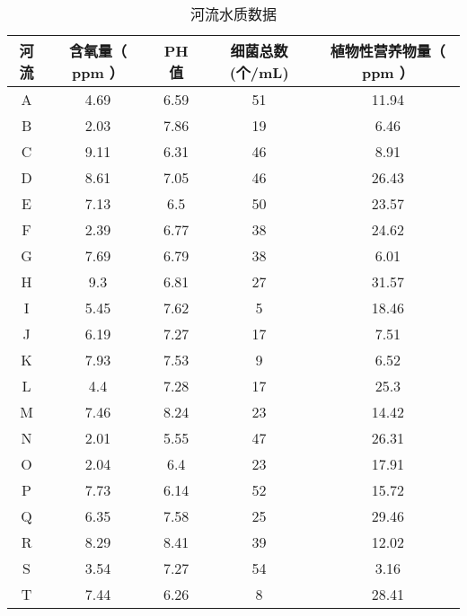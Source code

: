 \documentclass[withoutpreface]{cumcmthesis}
\begin{document}
    \begin{table}[H]
        \centering
        \caption{河流水质数据}\label{Tab:1}
        \begin{tabular}{|c|c|c|c|c|}
        \hline
        \textbf{河流} & \multicolumn{1}{c|}{\textbf{含氧量（ ppm ）}} & \multicolumn{1}{c|}{\textbf{PH 值}} & \multicolumn{1}{c|}{\textbf{细菌总数(个/mL)}} & \multicolumn{1}{c|}{\textcolor[rgb]{ .2,  .2,  .2}{\textbf{植物性营养物量（ ppm ）}}} \bigstrut\\
        \hline
        A     & 4.69  & 6.59  & 51    & 11.94 \bigstrut\\
        \hline
        B     & 2.03  & 7.86  & 19    & 6.46 \bigstrut\\
        \hline
        C     & 9.11  & 6.31  & 46    & 8.91 \bigstrut\\
        \hline
        D     & 8.61  & 7.05  & 46    & 26.43 \bigstrut\\
        \hline
        E     & 7.13  & 6.5   & 50    & 23.57 \bigstrut\\
        \hline
        F     & 2.39  & 6.77  & 38    & 24.62 \bigstrut\\
        \hline
        G     & 7.69  & 6.79  & 38    & 6.01 \bigstrut\\
        \hline
        H     & 9.3   & 6.81  & 27    & 31.57 \bigstrut\\
        \hline
        I     & 5.45  & 7.62  & 5     & 18.46 \bigstrut\\
        \hline
        J     & 6.19  & 7.27  & 17    & 7.51 \bigstrut\\
        \hline
        K     & 7.93  & 7.53  & 9     & 6.52 \bigstrut\\
        \hline
        L     & 4.4   & 7.28  & 17    & 25.3 \bigstrut\\
        \hline
        M     & 7.46  & 8.24  & 23    & 14.42 \bigstrut\\
        \hline
        N     & 2.01  & 5.55  & 47    & 26.31 \bigstrut\\
        \hline
        O     & 2.04  & 6.4   & 23    & 17.91 \bigstrut\\
        \hline
        P     & 7.73  & 6.14  & 52    & 15.72 \bigstrut\\
        \hline
        Q     & 6.35  & 7.58  & 25    & 29.46 \bigstrut\\
        \hline
        R     & 8.29  & 8.41  & 39    & 12.02 \bigstrut\\
        \hline
        S     & 3.54  & 7.27  & 54    & 3.16 \bigstrut\\
        \hline
        T     & 7.44  & 6.26  & 8     & 28.41 \bigstrut\\
        \hline
        \end{tabular}
    \end{table}
\end{document}
